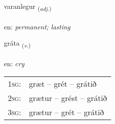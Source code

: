 \documentclass[frontgrid, backgrid]{flacards}\usepackage[]{graphicx}\usepackage[]{color}
\begin{document}
\renewcommand{\flhead}{\vskip5pt \fboxsep=0pt {\small\bfseries\footnotesize Lýsingarorð | Adjective}}
\renewcommand{\fcfoot}{\vskip5pt \fboxsep=0pt \hspace{2pt}{\small\bfseries\footnotesize 2K}}

\renewcommand{\blhead}{\vskip5pt {\small\bfseries\footnotesize Lýsingarorð | Adjective }}
\renewcommand{\bcfoot}{\vskip5pt \hspace{2pt}{\small\bfseries\footnotesize 2K}}


{varanlegur \small{\textsubscript{(\textit{adj.})}} \\[1ex] %
\textphonetic{[vaːranlɛɣʏr]} \\
en: \emph{permanent; lasting} \\  [2ex]
\renewcommand*{\arraystretch}{0.8}
}

\renewcommand{\flhead}{\vskip5pt \fboxsep=0pt {\small\bfseries\footnotesize Sagnorð | Verb}}
\renewcommand{\fcfoot}{\vskip5pt \fboxsep=0pt \hspace{2pt}{\small\bfseries\footnotesize 2K}}

\renewcommand{\blhead}{\vskip5pt {\small\bfseries\footnotesize Sagnorð | Verb }}
\renewcommand{\bcfoot}{\vskip5pt \hspace{2pt}{\small\bfseries\footnotesize 2K}}


{gráta \small{\textsubscript{(\textit{v.})}} \\[1ex] %
\textphonetic{[krauːta]} \\
en: \emph{cry} \\  [2ex]
\renewcommand*{\arraystretch}{0.8}
\begin{tabular}{p{1cm}l}
\textsc{1sg}: & græt -- grét -- grátið \\ 
\textsc{2sg}: & grætur -- grést -- grátið \\ 
\textsc{3sg}: & grætur -- grét -- grátið \\ 
\end{tabular}
}
\end{document}
